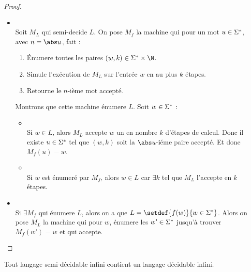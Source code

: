 \begin{proof}
	\begin{itemize}
		\item \bimpRL \\
		      Soit $M_L$ qui semi-decide $L$. On pose $M_f$ la machine qui pour un mot $u \in \Sigma^{*}$, avec $n = \abs u$, fait :
		      \begin{enumerate}
			      \item Énumere toutes les paires $(w,k) \in \mots \times \N$.
			      \item Simule l'exécution de $M_L$ sur l'entrée $w$ en au plus $k$ étapes.
			      \item Retourne le $n$-ième mot accepté.
		      \end{enumerate}

		      Montrons que cette machine énumere $L$. Soit $w \in \Sigma^{*}$ :
		      \begin{itemize}
			      \item \bimpLR \\
			            Si $w \in L$, alors $M_L$ accepte $w$ un en nombre $k$ d'étapes de calcul. Donc il existe $u \in \Sigma^{*}$ tel que
			            $(w,k)$ soit la $\abs u$-iéme paire accepté. Et donc $M_f(u) = w$.
			      \item \bimpRL \\
			            Si $w$ est énumeré par $M_f$, alors $w \in L$ car $\exists k$ tel que $M_L$ l'accepte en $k$ étapes.
		      \end{itemize}

		\item \bimpLR \\
		      Si $\exists M_f$ qui énumere $L$, alors on a que $L = \setdef {f(w)} {w \in \mots}$. Alors on pose $M_L$ la machine qui pour $w$,
		      énumere les $w' \in \Sigma^{*}$ jusqu'à trouver $M_f(w') = w$ et qui accepte.
	\end{itemize}
\end{proof}


\begin{prop}
	Tout langage semi-décidable infini contient un langage décidable infini.
\end{prop}

